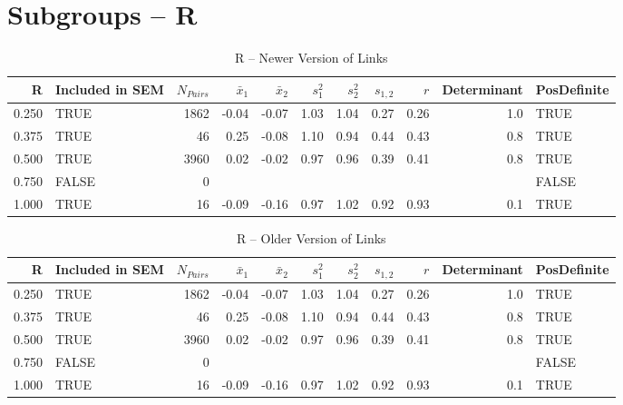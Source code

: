 \documentclass{article}\usepackage[]{graphicx}\usepackage[]{color}
\begin{document}
\section{Subgroups --  R }%
\begin{table}[ht]
\centering
\begin{tabular}{rlrrrrrrrrl}
  \hline
R & Included in SEM & $N_{Pairs}$ & $\bar{x}_1$ & $\bar{x}_2$ & $s_1^2$ & $s_2^2$ & $s_{1,2}$ & $r$ & Determinant & PosDefinite \\ 
  \hline
0.250 & TRUE & 1862 & -0.04 & -0.07 & 1.03 & 1.04 & 0.27 & 0.26 & 1.0 & TRUE \\ 
  0.375 & TRUE & 46 & 0.25 & -0.08 & 1.10 & 0.94 & 0.44 & 0.43 & 0.8 & TRUE \\ 
  0.500 & TRUE & 3960 & 0.02 & -0.02 & 0.97 & 0.96 & 0.39 & 0.41 & 0.8 & TRUE \\ 
  0.750 & FALSE & 0 &  &  &  &  &  &  &  & FALSE \\ 
  1.000 & TRUE & 16 & -0.09 & -0.16 & 0.97 & 1.02 & 0.92 & 0.93 & 0.1 & TRUE \\ 
   \hline
\end{tabular}
\caption{R -- Newer Version of Links} 
\end{table}
\begin{table}[ht]
\centering
\begin{tabular}{rlrrrrrrrrl}
  \hline
R & Included in SEM & $N_{Pairs}$ & $\bar{x}_1$ & $\bar{x}_2$ & $s_1^2$ & $s_2^2$ & $s_{1,2}$ & $r$ & Determinant & PosDefinite \\ 
  \hline
0.250 & TRUE & 1862 & -0.04 & -0.07 & 1.03 & 1.04 & 0.27 & 0.26 & 1.0 & TRUE \\ 
  0.375 & TRUE & 46 & 0.25 & -0.08 & 1.10 & 0.94 & 0.44 & 0.43 & 0.8 & TRUE \\ 
  0.500 & TRUE & 3960 & 0.02 & -0.02 & 0.97 & 0.96 & 0.39 & 0.41 & 0.8 & TRUE \\ 
  0.750 & FALSE & 0 &  &  &  &  &  &  &  & FALSE \\ 
  1.000 & TRUE & 16 & -0.09 & -0.16 & 0.97 & 1.02 & 0.92 & 0.93 & 0.1 & TRUE \\ 
   \hline
\end{tabular}
\caption{R -- Older Version of Links} 
\end{table}
\newpage 
\end{document}
